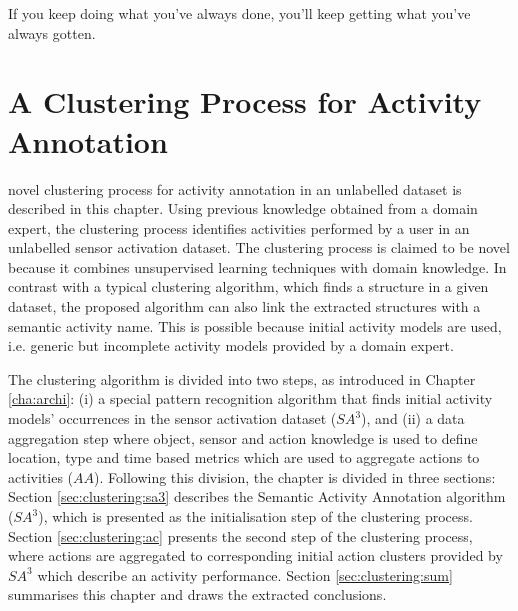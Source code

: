 

\begin{savequote}[50mm]
If you keep doing what you've always done, you'll keep getting what you've always gotten.
\end{savequote}


\chapter{A Clustering Process for Activity Annotation}
\label{cha:clustering}

\ifpdf
    \graphicspath{{4_clustering_process/figures/PDF/}{4_clustering_process/figures/PNG/}{4_clustering_process/figures/}}
\else
    \graphicspath{{4_clustering_process/figures/EPS/}{4_clustering_process/figures/}}
\fi

 novel clustering process for activity annotation in an unlabelled dataset is described in this chapter. Using previous knowledge obtained from a domain expert, the clustering process identifies activities performed by a user in an unlabelled sensor activation dataset. The clustering process is claimed to be novel because it combines unsupervised learning techniques with domain knowledge. In contrast with a typical clustering algorithm, which finds a structure in a given dataset, the proposed algorithm can also link the extracted structures with a semantic activity name. This is possible because initial activity models are used, i.e. generic but incomplete activity models provided by a domain expert. 

The clustering algorithm is divided into two steps, as introduced in Chapter \ref{cha:archi}: (i) a special pattern recognition algorithm that finds initial activity models' occurrences in the sensor activation dataset ($SA^3$), and (ii) a data aggregation step where object, sensor and action knowledge is used to define location, type and time based metrics which are used to aggregate actions to activities ($AA$). Following this division, the chapter is divided in three sections: Section \ref{sec:clustering:sa3} describes the Semantic Activity Annotation algorithm ($SA^3$), which is presented as the initialisation step of the clustering process. Section \ref{sec:clustering:ac} presents the second step of the clustering process, where actions are aggregated to corresponding initial action clusters provided by $SA^3$ which describe an activity performance. Section \ref{sec:clustering:sum} summarises this chapter and draws the extracted conclusions.


